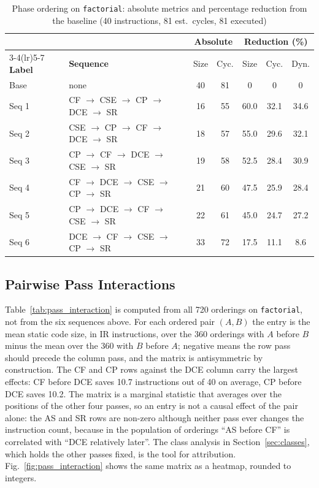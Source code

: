 \documentclass[conference,a4paper]{IEEEtran}
\begin{document}
\begin{table}[!htbp]
\centering
\caption{Phase ordering on \texttt{factorial}: absolute metrics and percentage reduction from the baseline (40 instructions, 81 est.\ cycles, 81 executed)}
\label{tab:phase_order_tradeoff}
\renewcommand{\arraystretch}{1.1}
{\footnotesize
\setlength{\tabcolsep}{2.6pt}
\begin{tabular}{@{}llccccc@{}}
\toprule
 & & \multicolumn{2}{c}{\textbf{Absolute}} & \multicolumn{3}{c}{\textbf{Reduction (\%)}} \\
\cmidrule(lr){3-4}\cmidrule(lr){5-7}
\textbf{Label} & \textbf{Sequence} & Size & Cyc. & Size & Cyc. & Dyn. \\
\midrule
Base  & none & 40 & 81 & 0 & 0 & 0 \\
Seq 1 & CF $\to$ CSE $\to$ CP $\to$ DCE $\to$ SR & 16 & 55 & 60.0 & 32.1 & 34.6 \\
Seq 2 & CSE $\to$ CP $\to$ CF $\to$ DCE $\to$ SR & 18 & 57 & 55.0 & 29.6 & 32.1 \\
Seq 3 & CP $\to$ CF $\to$ DCE $\to$ CSE $\to$ SR & 19 & 58 & 52.5 & 28.4 & 30.9 \\
Seq 4 & CF $\to$ DCE $\to$ CSE $\to$ CP $\to$ SR & 21 & 60 & 47.5 & 25.9 & 28.4 \\
Seq 5 & CP $\to$ DCE $\to$ CF $\to$ CSE $\to$ SR & 22 & 61 & 45.0 & 24.7 & 27.2 \\
Seq 6 & DCE $\to$ CF $\to$ CSE $\to$ CP $\to$ SR & 33 & 72 & 17.5 & 11.1 & 8.6 \\
\bottomrule
\end{tabular}
}
\end{table}

\subsection{Pairwise Pass Interactions}
\label{sec:interaction}
Table~\ref{tab:pass_interaction} is computed from all 720 orderings on \texttt{factorial}, not from the six sequences above. For each ordered pair $(A, B)$ the entry is the mean static code size, in IR instructions, over the 360 orderings with $A$ before $B$ minus the mean over the 360 with $B$ before $A$; negative means the row pass should precede the column pass, and the matrix is antisymmetric by construction. The CF and CP rows against the DCE column carry the largest effects: CF before DCE saves 10.7 instructions out of 40 on average, CP before DCE saves 10.2. The matrix is a marginal statistic that averages over the positions of the other four passes, so an entry is not a causal effect of the pair alone: the AS and SR rows are non-zero although neither pass ever changes the instruction count, because in the population of orderings ``AS before CF'' is correlated with ``DCE relatively later''. The class analysis in Section~\ref{sec:classes}, which holds the other passes fixed, is the tool for attribution. Fig.~\ref{fig:pass_interaction} shows the same matrix as a heatmap, rounded to integers.
\end{document}
